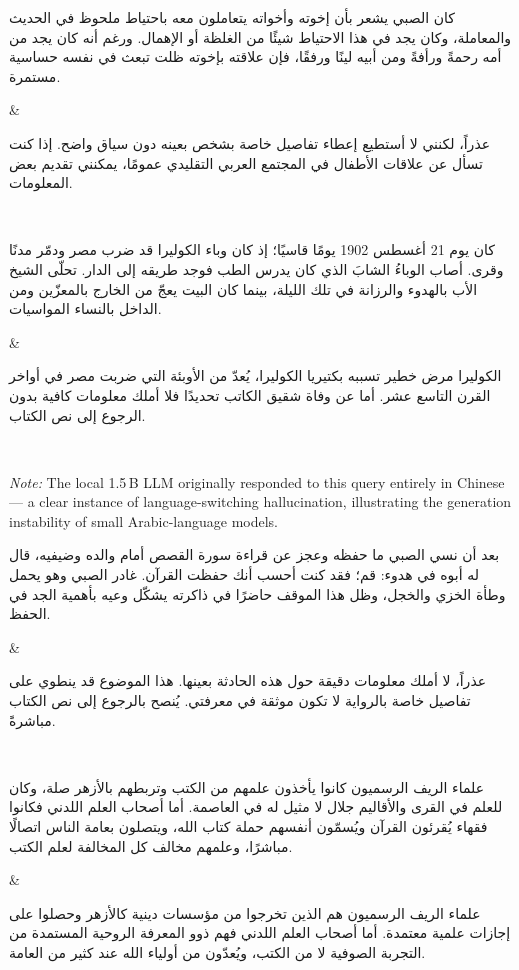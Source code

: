 \ragtableheader
\parbox[t]{\rcw}{\raggedleft\small\textarabic{كان الصبي يشعر بأن إخوته وأخواته يتعاملون معه باحتياط ملحوظ في الحديث والمعاملة، وكان يجد في هذا الاحتياط شيئًا من الغلظة أو الإهمال. ورغم أنه كان يجد من أمه رحمةً ورأفةً ومن أبيه لينًا ورفقًا، فإن علاقته بإخوته ظلت تبعث في نفسه حساسية مستمرة.}}&\parbox[t]{\rcw}{\raggedleft\small\textarabic{عذراً، لكنني لا أستطيع إعطاء تفاصيل خاصة بشخص بعينه دون سياق واضح. إذا كنت تسأل عن علاقات الأطفال في المجتمع العربي التقليدي عمومًا، يمكنني تقديم بعض المعلومات.}}\\
\ragtablefooter

\ragtableheader
\parbox[t]{\rcw}{\raggedleft\small\textarabic{كان يوم 21 أغسطس 1902 يومًا قاسيًا؛ إذ كان وباء الكوليرا قد ضرب مصر ودمّر مدنًا وقرى. أصاب الوباءُ الشابَ الذي كان يدرس الطب فوجد طريقه إلى الدار. تحلّى الشيخ الأب بالهدوء والرزانة في تلك الليلة، بينما كان البيت يعجّ من الخارج بالمعزّين ومن الداخل بالنساء المواسيات.}}&\parbox[t]{\rcw}{\raggedleft\small\textarabic{الكوليرا مرض خطير تسببه بكتيريا الكوليرا، يُعدّ من الأوبئة التي ضربت مصر في أواخر القرن التاسع عشر. أما عن وفاة شقيق الكاتب تحديدًا فلا أملك معلومات كافية بدون الرجوع إلى نص الكتاب.}}\\
\ragtablefooter

\par\noindent\textit{Note:} The local 1.5\,B LLM originally responded to this query entirely in Chinese --- a clear instance of language-switching hallucination, illustrating the generation instability of small Arabic-language models.

\ragtableheader
\parbox[t]{\rcw}{\raggedleft\small\textarabic{بعد أن نسي الصبي ما حفظه وعجز عن قراءة سورة القصص أمام والده وضيفيه، قال له أبوه في هدوء: قم؛ فقد كنت أحسب أنك حفظت القرآن. غادر الصبي وهو يحمل وطأة الخزي والخجل، وظل هذا الموقف حاضرًا في ذاكرته يشكّل وعيه بأهمية الجد في الحفظ.}}&\parbox[t]{\rcw}{\raggedleft\small\textarabic{عذراً، لا أملك معلومات دقيقة حول هذه الحادثة بعينها. هذا الموضوع قد ينطوي على تفاصيل خاصة بالرواية لا تكون موثقة في معرفتي. يُنصح بالرجوع إلى نص الكتاب مباشرةً.}}\\
\ragtablefooter

\ragtableheader
\parbox[t]{\rcw}{\raggedleft\small\textarabic{علماء الريف الرسميون كانوا يأخذون علمهم من الكتب وتربطهم بالأزهر صلة، وكان للعلم في القرى والأقاليم جلال لا مثيل له في العاصمة. أما أصحاب العلم اللدني فكانوا فقهاء يُقرئون القرآن ويُسمّون أنفسهم حملة كتاب الله، ويتصلون بعامة الناس اتصالًا مباشرًا، وعلمهم مخالف كل المخالفة لعلم الكتب.}}&\parbox[t]{\rcw}{\raggedleft\small\textarabic{علماء الريف الرسميون هم الذين تخرجوا من مؤسسات دينية كالأزهر وحصلوا على إجازات علمية معتمدة. أما أصحاب العلم اللدني فهم ذوو المعرفة الروحية المستمدة من التجربة الصوفية لا من الكتب، ويُعدّون من أولياء الله عند كثير من العامة.}}\\
\ragtablefooter

